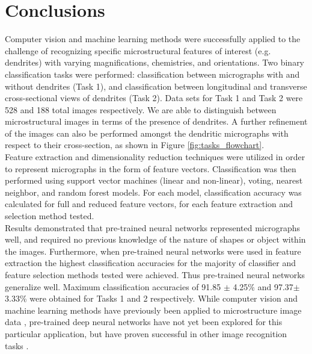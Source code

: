 \section{Conclusions}
\label{conclusions}

Computer vision and machine learning methods were successfully applied to the challenge of recognizing specific microstructural features of interest (e.g. dendrites) with varying magnifications, chemistries, and orientations.
%
Two binary classification tasks were performed: classification between micrographs with and without dendrites (Task 1), and classification between longitudinal and transverse cross-sectional views of dendrites (Task 2).  Data sets for Task 1 and Task 2 were 528 and 188 total images respectively. We are able to distinguish between microstructural images in terms of the presence of dendrites. A further refinement of the images can also be performed amongst the dendritic micrographs with respect to their cross-section, as shown in Figure \ref{fig:tasks_flowchart}. %
%
\\
Feature extraction and dimensionality reduction techniques were utilized in order to represent micrographs in the form of feature vectors.  Classification was then performed using support vector machines (linear and non-linear), voting, nearest neighbor, and random forest models.
%
For each model, classification accuracy was calculated for full and reduced feature vectors, for each feature extraction and selection method tested. 
\\

Results demonstrated that pre-trained neural networks represented micrographs well, and required no previous knowledge of the nature of shapes or object within the images. Furthermore, when pre-trained neural networks were used in feature extraction the highest classification accuracies for the majority of classifier and feature selection methods tested were achieved. Thus pre-trained neural networks generalize well. 
%
Maximum classification accuracies of 91.85 $\pm$ 4.25\% and 97.37$\pm$ 3.33\% were obtained for Tasks 1 and 2 respectively. 
%
While computer vision and machine learning methods have previously been applied to microstructure image data \cite{DeCost2015, Impoco2015, XuH2015, Bostanabad2016, Taffese2015}, pre-trained deep neural networks have not yet been explored for this particular application, but have proven successful in other image recognition tasks \cite{Guo2016}.  \\

